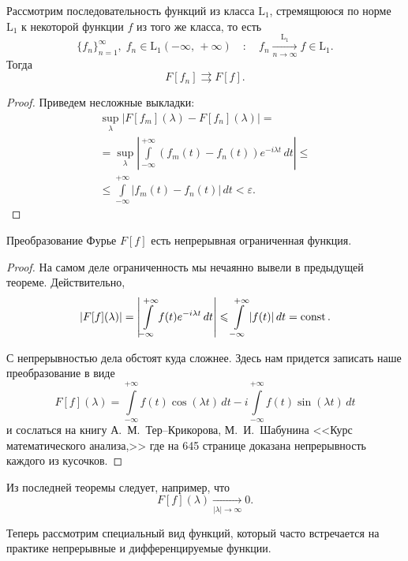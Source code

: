 \begin{theorem}
        Рассмотрим последовательность функций из класса $\mathrm{L}_1$, стремящююся по норме $\mathrm{L}_1$ к некоторой функции $f$ из того же класса, то есть
$$
        \{f_n\}_{n=1}^{\infty},\;f_n \in \mathrm{L}_1(-\infty,\,+\infty)
\quad : \quad
        f_n \xrightarrow[n\to\infty]{\mathrm{L}_1} f \in \mathrm{L}_1.
$$
Тогда
$$
        F[f_n] \rightrightarrows F[f].
$$
\end{theorem}
\begin{proof} Приведем несложные выкладки:
\begin{multline*}
        \sup\limits_{\lambda}|F[f_m](\lambda) - F[f_n](\lambda)| = \\
        =\sup\limits_\lambda\left|\int\limits_{-\infty}^{+\infty}(f_m(t) - f_n(t))e^{-i\lambda t}\, dt\right| \leqslant \\
        \leqslant\int\limits_{-\infty}^{+\infty}|f_m(t) - f_n(t)|\,dt < \varepsilon.
\end{multline*}
\end{proof}

\begin{theorem}
        Преобразование Фурье $F[f]$ есть непрерывная ограниченная функция.
\end{theorem}
\begin{proof}
        На самом деле ограниченность мы нечаянно вывели в предыдущей теореме. Действительно,
$$
        |F[f](\lambda)| = \left|\int\limits_{-\infty}^{+\infty} f(t) e^{-i\lambda t}\,dt\right| \leqslant \int\limits_{-\infty}^{+\infty}|f(t)|\,dt = \operatorname{const}.
$$
        
        С непрерывностью дела обстоят куда сложнее. Здесь нам придется записать наше преобразование в виде
$$
        F[f](\lambda) = \int\limits_{-\infty}^{+\infty}f(t)\cos(\lambda t)\,dt - i\int\limits_{-\infty}^{+\infty}f(t)\sin(\lambda t)\,dt
$$
        и сослаться на книгу А.~М.~Тер--Крикорова, М.~И.~Шабунина <<Курс математического анализа,>> где на 645 странице доказана непрерывность каждого из кусочков.
\end{proof}
\begin{remark}
        Из последней теоремы следует, например, что
$$
        F[f](\lambda)\xrightarrow[|\lambda|\to\infty]{} 0.
$$
\end{remark}

Теперь рассмотрим специальный вид функций, который часто встречается на практике непрерывные и дифференцируемые функции.


